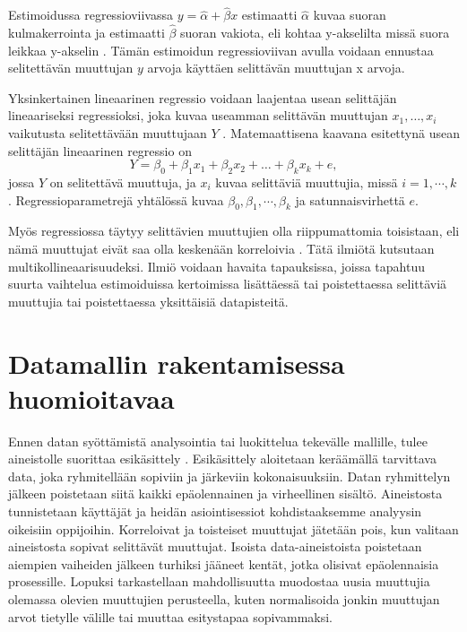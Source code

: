 Estimoidussa regressioviivassa $y = \hat{\alpha} + \hat{\beta}x$ estimaatti $\hat{\alpha}$ kuvaa suoran kulmakerrointa ja estimaatti $\hat{\beta}$ suoran vakiota, eli kohtaa y-akselilta missä suora leikkaa y-akselin \citep{rossIntroductoryStatistics2017}. Tämän estimoidun regressioviivan avulla voidaan ennustaa selitettävän muuttujan $y$ arvoja käyttäen selittävän muuttujan x arvoja.

Yksinkertainen lineaarinen regressio voidaan laajentaa usean selittäjän lineaariseksi regressioksi, joka kuvaa useamman selittävän muuttujan $x_1, \ldots, x_i$ vaikutusta selitettävään muuttujaan $Y$ \citep{rossIntroductoryStatistics2017}. Matemaattisena kaavana esitettynä usean selittäjän lineaarinen regressio on $$Y = \beta_0 + \beta_1x_1 + \beta_2x_2 + \ldots + \beta_kx_k + e,$$ jossa $Y$ on selitettävä muuttuja, ja $x_i$ kuvaa selittäviä muuttujia, missä $i = 1, \cdots, k$. Regressioparametrejä yhtälössä kuvaa $\beta_0, \beta_1, \cdots, \beta_k$ ja satunnaisvirhettä $e$.

Myös regressiossa täytyy selittävien muuttujien olla riippumattomia toisistaan, eli nämä muuttujat eivät saa olla keskenään korreloivia \citep{daoudMulticollinearityRegressionAnalysis2017}. Tätä ilmiötä kutsutaan multikollineaarisuudeksi. Ilmiö voidaan havaita tapauksissa, joissa tapahtuu suurta vaihtelua estimoiduissa kertoimissa lisättäessä tai poistettaessa selittäviä muuttujia tai poistettaessa yksittäisiä datapisteitä.

\section{Datamallin rakentamisessa huomioitavaa}
\color{blue}
Ennen datan syöttämistä analysointia tai luokittelua tekevälle mallille, tulee aineistolle suorittaa esikäsittely \citep{romeroSurveyPreProcessingEducational2014}. Esikäsittely aloitetaan keräämällä tarvittava data, joka ryhmitellään sopiviin ja järkeviin kokonaisuuksiin. Datan ryhmittelyn jälkeen poistetaan siitä kaikki epäolennainen ja virheellinen sisältö.
Aineistosta tunnistetaan käyttäjät ja heidän asiointisessiot kohdistaaksemme analyysin oikeisiin oppijoihin.
Korreloivat ja toisteiset muuttujat jätetään pois, kun valitaan aineistosta sopivat selittävät muuttujat. Isoista data-aineistoista poistetaan aiempien vaiheiden jälkeen turhiksi jääneet kentät, jotka olisivat epäolennaisia prosessille. Lopuksi tarkastellaan mahdollisuutta muodostaa uusia muuttujia olemassa olevien muuttujien perusteella, kuten normalisoida jonkin muuttujan arvot tietylle välille tai muuttaa esitystapaa sopivammaksi.

